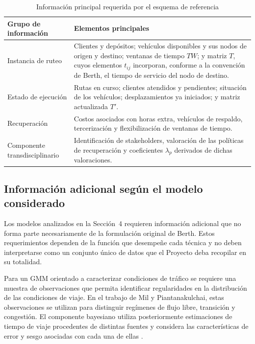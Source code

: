 \documentclass[11pt]{article}
\begin{document}
\begin{table}[ht]
\centering
\small
\caption{Información principal requerida por el esquema de referencia}
\label{tab:datos_referencia}

\renewcommand{\arraystretch}{1.15}

\begin{tabularx}{\textwidth}{
@{}
>{\raggedright\arraybackslash}p{}
>{\raggedright\arraybackslash}X
@{}}
\toprule
\textbf{Grupo de información} &
\textbf{Elementos principales} \\
\midrule

Instancia de ruteo &
Clientes y depósitos; vehículos disponibles y sus nodos de origen y destino;
ventanas de tiempo \(TW\); y matriz \(T\), cuyos elementos \(t_{ij}\) incorporan,
conforme a la convención de Berth, el tiempo de servicio del nodo de destino. \\[0.25em]

Estado de ejecución &
Rutas en curso; clientes atendidos y pendientes; situación de los vehículos;
desplazamientos ya iniciados; y matriz actualizada \(T'\). \\[0.25em]

Recuperación &
Costos asociados con horas extra, vehículos de respaldo, tercerización y
flexibilización de ventanas de tiempo. \\[0.25em]

Componente transdisciplinario &
Identificación de stakeholders, valoración de las políticas de recuperación y
coeficientes \(\lambda_p\) derivados de dichas valoraciones. \\

\bottomrule
\end{tabularx}
\end{table}


\subsection{Información adicional según el modelo considerado}

Los modelos analizados en la Sección~4 requieren información adicional que no forma
parte necesariamente de la formulación original de Berth. Estos requerimientos
dependen de la función que desempeñe cada técnica y no deben interpretarse como un
conjunto único de datos que el Proyecto deba recopilar en su totalidad.

Para un GMM orientado a caracterizar condiciones de tráfico se requiere una muestra
de observaciones que permita identificar regularidades en la distribución de las
condiciones de viaje. En el trabajo de Mil y Piantanakulchai, estas observaciones se
utilizan para distinguir regímenes de flujo libre, transición y congestión. El componente
bayesiano utiliza posteriormente estimaciones de tiempo de viaje procedentes de
distintas fuentes y considera las características de error y sesgo asociadas con cada
una de ellas \parencite{mil_piantanakulchai_2018}.
\end{document}
